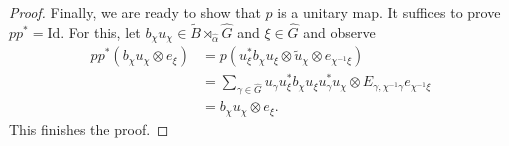 \documentclass[10pt,a4paper]{amsart}
\begin{document}
\begin{proof}
    Finally, we are ready to show that $p$ is a unitary map. It suffices to prove $p p^\ast = \mathrm{Id}$. For this, let $b_\chi u_\chi \in \tilde{B} \rtimes_{\hat{\alpha}} \hat{G}$ and $\xi \in \hat{G}$ and observe
    \begin{align*}
        pp^\ast(b_\chi u_\chi \otimes e_\xi) 
            &= p\left( u_\xi^\ast b_\chi u_\xi \otimes \tilde{u}_\chi \otimes e_{\chi^{-1}\xi} \right) \\
            &=  \sum_{\gamma \in \hat{G}} u_\gamma u_\xi^\ast b_\chi u_\xi u_\gamma^\ast u_\chi \otimes E_{\gamma, \chi^{-1} \gamma} e_{\chi^{-1}\xi} \\
            &= b_\chi u_\chi \otimes e_\xi.
    \end{align*}
    This finishes the proof.
\end{proof}
\end{document}
